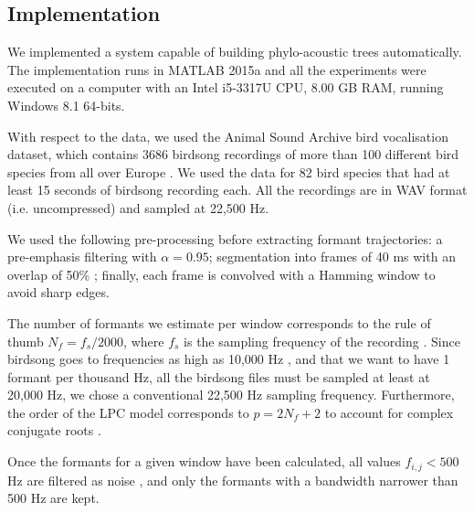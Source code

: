 \documentclass[pdftex,11pt,a4paper]{article}
\theoremstyle{definition}
\theoremstyle{remark}
\begin{document}
\subsection{Implementation}
We implemented a system capable of building phylo-acoustic trees automatically. The implementation runs in MATLAB 2015a and all the experiments were executed on a computer with an Intel i5-3317U CPU, 8.00 GB RAM, running Windows 8.1 64-bits. 
\par With respect to the data, we used the Animal Sound Archive bird vocalisation dataset, which contains 3686 birdsong recordings of more than 100 different bird species from all over Europe \cite{AnimalSoundArchive2015}. We used the data for 82 bird species that had at least 15 seconds of birdsong recording each. All the recordings are in WAV format (i.e. uncompressed) and sampled at 22,500 Hz.
\par We used the following pre-processing before extracting formant trajectories: a pre-emphasis filtering with $\alpha = 0.95$; segmentation into frames of 40 ms with an overlap of 50\% \cite{Stowell2014}; finally, each frame is convolved with a Hamming window to avoid sharp edges. 
\par The number of formants we estimate per window corresponds to the rule of thumb $N_f = f_s / 2000$, where $f_s$ is the sampling frequency of the recording \cite{markel1976}. Since birdsong goes to frequencies as high as 10,000 Hz \cite{Marler2004}, and that we want to have 1 formant per thousand Hz, all the birdsong files must be sampled at least at 20,000 Hz, we chose a conventional 22,500 Hz sampling frequency. Furthermore, the order of the LPC model corresponds to $p = 2N_f + 2$ to account for complex conjugate roots \cite{Benesty}. 
\par Once the formants for a given window have been calculated, all values $f_{i, j} < 500$ Hz are filtered as noise \cite{Stowell2014}, and only the formants with a bandwidth narrower than 500 Hz are kept. 
\end{document}
